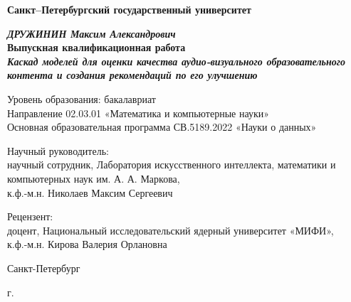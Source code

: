 \begin{titlepage}
    \begin{center}

        \textbf{Санкт--Петербургский государственный университет}


        \vspace{35mm}

        \textbf{\textit{\large ДРУЖИНИН Максим Александрович}} \\[8mm]
        \textbf{\large Выпускная квалификационная работа}\\[3mm]
        \textbf{\textit{\large Каскад моделей для оценки качества аудио-визуального образовательного контента и создания рекомендаций по его улучшению}}

        \vspace{20mm}
        Уровень образования: бакалавриат\\
        Направление 02.03.01 «Математика и компьютерные науки»\\
        Основная образовательная программа СВ.5189.2022 «Науки о данных»\\[20mm]

        \begin{flushright}
            \begin{minipage}[t]{0.65\textwidth}
                {Научный руководитель:} \\
               научный сотрудник, Лаборатория искусственного интеллекта, математики и компьютерных наук им. А. А. Маркова,  \\к.ф.-м.н. Николаев Максим Сергеевич
                \vspace{5mm}

                {Рецензент:} \\
                доцент, Национальный исследовательский ядерный университет «МИФИ», \\к.ф.-м.н. Кирова Валерия Орлановна
            \end{minipage}
        \end{flushright}

        \vfill

        {Санкт-Петербург}
        \par{\the\year{} г.}
    \end{center}
\end{titlepage}
\restoregeometry
\addtocounter{page}{1}

